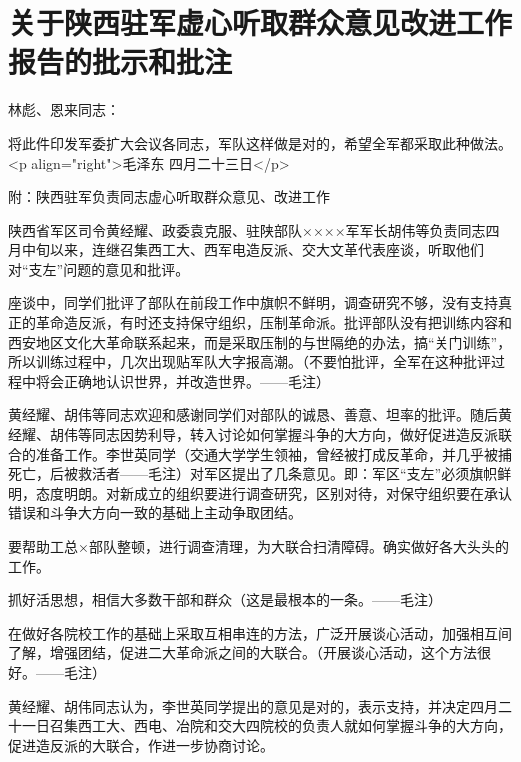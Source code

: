 \section[关于陕西驻军虚心听取群众意见改进工作报告的批示和批注（一九六七年四月二十三日）]{关于陕西驻军虚心听取群众意见改进工作报告的批示和批注}


林彪、恩来同志：

将此件印发军委扩大会议各同志，军队这样做是对的，希望全军都采取此种做法。
<p align="right">毛泽东
四月二十三日</p>

附：陕西驻军负责同志虚心听取群众意见、改进工作

陕西省军区司令黄经耀、政委袁克服、驻陕部队××××军军长胡伟等负责同志四月中旬以来，连继召集西工大、西军电造反派、交大文革代表座谈，听取他们对“支左”问题的意见和批评。

座谈中，同学们批评了部队在前段工作中旗帜不鲜明，调查研究不够，没有支持真正的革命造反派，有时还支持保守组织，压制革命派。批评部队没有把训练内容和西安地区文化大革命联系起来，而是采取压制的与世隔绝的办法，搞“关门训练”，所以训练过程中，几次出现贴军队大字报高潮。（不要怕批评，全军在这种批评过程中将会正确地认识世界，并改造世界。——毛注）

黄经耀、胡伟等同志欢迎和感谢同学们对部队的诚恳、善意、坦率的批评。随后黄经耀、胡伟等同志因势利导，转入讨论如何掌握斗争的大方向，做好促进造反派联合的准备工作。李世英同学（交通大学学生领袖，曾经被打成反革命，并几乎被捕死亡，后被救活者——毛注）对军区提出了几条意见。即：军区“支左”必须旗帜鲜明，态度明朗。对新成立的组织要进行调查研究，区别对待，对保守组织要在承认错误和斗争大方向一致的基础上主动争取团结。

要帮助工总×部队整顿，进行调查清理，为大联合扫清障碍。确实做好各大头头的工作。

抓好活思想，相信大多数干部和群众（这是最根本的一条。——毛注）

在做好各院校工作的基础上采取互相串连的方法，广泛开展谈心活动，加强相互间了解，增强团结，促进二大革命派之间的大联合。（开展谈心活动，这个方法很好。——毛注）

黄经耀、胡伟同志认为，李世英同学提出的意见是对的，表示支持，并决定四月二十一日召集西工大、西电、冶院和交大四院校的负责人就如何掌握斗争的大方向，促进造反派的大联合，作进一步协商讨论。


